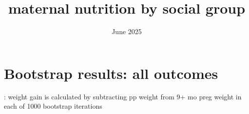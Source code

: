 \documentclass{article}
\title{maternal nutrition by social group}
\date{June 2025}
\begin{document}
\maketitle


\section{Bootstrap results: all outcomes}

\begin{table}[H]
    \centering
    \footnotesize %
    \label{tab:sumstat}
    \caption{: weight gain is calculated by subtracting pp weight from 9+ mo preg weight in each of 1000 bootstrap iterations}
\end{table}







\end{document}
